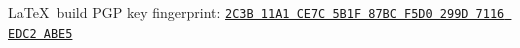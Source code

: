 \documentclass[12pt,twoside,letterpaper]{article}
\begin{document}

\vfill
{\noindent\tiny \LaTeX\ build }
\hfill
PGP key fingerprint:
\href{http://cnadocs.com/Joe.Loughry.txt}%
{\texttt{2C3B 11A1 CE7C 5B1F 87BC  F5D0 299D 7116 EDC2 ABE5}}
\end{document}
